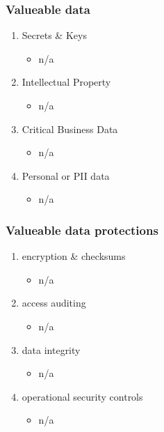 \documentclass[11pt]{article}
\begin{document}
\subsubsection{Valueable data}
\label{sec:org9bf417d}
\begin{enumerate}
\item Secrets \& Keys
\label{sec:orga310d4c}
\begin{itemize}
\item n/a
\end{itemize}
\item Intellectual Property
\label{sec:org73e0216}
\begin{itemize}
\item n/a
\end{itemize}
\item Critical Business Data
\label{sec:org84e3c6a}
\begin{itemize}
\item n/a
\end{itemize}
\item Personal or PII data
\label{sec:org5da1349}
\begin{itemize}
\item n/a
\end{itemize}
\end{enumerate}
\subsubsection{Valueable data protections}
\label{sec:org20ddd2b}
\begin{enumerate}
\item encryption \& checksums
\label{sec:org20dbd51}
\begin{itemize}
\item n/a
\end{itemize}
\item access auditing
\label{sec:org64470aa}
\begin{itemize}
\item n/a
\end{itemize}
\item data integrity
\label{sec:orgdd92f78}
\begin{itemize}
\item n/a
\end{itemize}
\item operational security controls
\label{sec:org51cd870}
\begin{itemize}
\item n/a
\end{itemize}
\end{enumerate}
\end{document}
